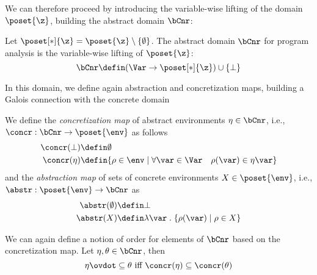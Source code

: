 
We can therefore proceed by introducing the variable-wise lifting of
the domain \(\poset{\z}\), building the abstract domain \(\bCnr\):

\begin{definition}
  Let \(\poset[*]{\z} = \poset{\z} \setminus \{\emptyset\}\). The
  abstract domain \(\bCnr\) for program analysis is the variable-wise
  lifting of \(\poset{\z}\):
  \[ \bCnr \defin (\Var \to \poset[*]{\z}) \cup \{ \bot \} \]
\end{definition}

In this domain, we define again abstraction and concretization maps,
building a Galois connection with the concrete domain

\begin{definition}\label{def:vwgalois}
  We define the \emph{concretization map} of abstract environments
  \(\eta \in \bCnr\), i.e., \({\concr : \bCnr \to \poset{\env}}\) as
  follows
  \begin{align*}
    \concr(\bot) & \defin \emptyset \\
    \concr(\eta) & \defin \{\rho \in \env \mid \forall \var \in \Var \quad \rho(\var) \in \eta\var\}
  \end{align*}
  and the \emph{abstraction map} of sets of concrete environments
  \(X \in \poset{\env}\), i.e., \(\abstr : \poset{\env} \to \bCnr\) as
  \begin{align*}
    \abstr(\emptyset) & \defin \bot \\
    \abstr(X) & \defin \lambda \var \; . \; \{\rho(\var) \mid \rho \in X\}
  \end{align*}
\end{definition}

We can again define a notion of order for elements of \(\bCnr\) based
on the concretization map. Let \(\eta, \theta \in \bCnr\), then
\begin{equation*}
  \eta \ovdot\subseteq \theta \text{ iff } \concr(\eta) \subseteq \concr(\theta)
\end{equation*}


